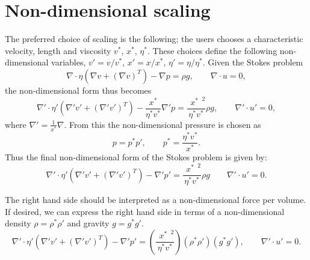 \documentclass[paper=a4, fontsize=10pt,twoside]{scrartcl}
\begin{document}
{{\section{Non-dimensional scaling}
The preferred choice of scaling is the following; the users chooses a characteristic velocity, length and viscosity $v^*$, $x^*$, $\eta^*$.
These choices define the following non-dimensional variables, $v' = v/v^*$, $x' = x/x^*$, $\eta' = \eta/\eta^*$. Given the Stokes problem
$$
	\nabla \cdot \eta \left( \nabla v + (\nabla v)^T \right) - \nabla p = \rho g,
	\qquad
	\nabla \cdot u = 0,
$$
the non-dimensional form thus becomes
$$
	\nabla' \cdot \eta' \left( \nabla' v' + (\nabla' v')^T \right) - \frac{x^*}{\eta^* v^*} \nabla' p = \frac{\phantom(x^*\phantom)^2}{\eta^* v^*} \rho g,
	\qquad
	\nabla' \cdot u' = 0,
$$
where $\nabla' = \frac{1}{x^*} \nabla$.
From this the non-dimensional pressure is chosen as
$$
	p = p^* p', \qquad p^* = \frac{\eta^* v^*}{x^*} .
$$
Thus the final non-dimensional form of the Stokes problem is given by:
$$
	\nabla' \cdot \eta' \left( \nabla' v' + (\nabla' v')^T \right) - \nabla' p'
	= \frac{\phantom(x^*\phantom)^2}{\eta^* v^*} \rho g
	\qquad
	\nabla' \cdot u' = 0.
$$

The right hand side should be interpreted as a non-dimensional force per volume. If desired, we can express the right hand side in terms of a non-dimensional density $\rho = \rho^* \rho'$ and gravity $g = g^* g'$.
$$
	\nabla' \cdot \eta' \left( \nabla' v' + (\nabla' v')^T \right) - \nabla' p'
	= 	\left( \frac{\phantom(x^*\phantom)^2}{\eta^* v^*}  \right)
		\left( \rho^* \rho' \right)  \left( g^* g' \right),
	\qquad
	\nabla' \cdot u' = 0.
$$

}}
\end{document}
